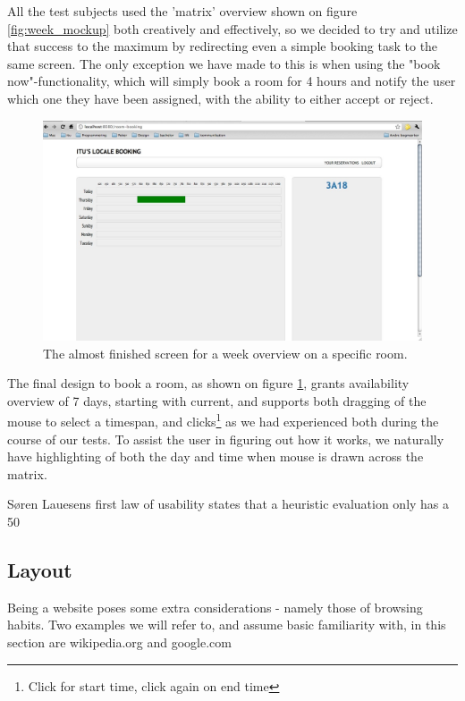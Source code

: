 All the test subjects used the 'matrix' overview shown on figure \ref{fig:week_mockup} both creatively and effectively, so we decided to try and utilize that success to the maximum by redirecting even a simple booking task to the same screen.
The only exception we have made to this is when using the "book now"-functionality, which will simply book a room for 4 hours and notify the user which one they have been assigned, with the ability to either accept or reject.

\begin{figure}[htb]
\begin{center}
\leavevmode
\includegraphics[width=1\textwidth]{images/weekFinal}
\end{center}
\caption{The almost finished screen for a week overview on a specific room.}
\label{fig:week_final}
\end{figure}

The final design to book a room, as shown on figure \ref{fig:week_final}, grants availability overview of 7 days, starting with current, and supports both dragging of the mouse to select a timespan, and clicks\footnote{Click for start time, click again on end time} as we had experienced both during the course of our tests.
To assist the user in figuring out how it works, we naturally have highlighting of both the day and time when mouse is drawn across the matrix.

Søren Lauesens first law of usability\cite{lauesen} states that a heuristic evaluation only has a 50%


\subsection{Layout}
Being a website poses some extra considerations - namely those of browsing habits. Two examples we will refer to, and assume basic familiarity with, in this section are wikipedia.org and google.com

